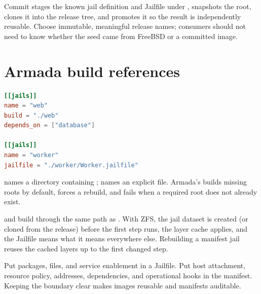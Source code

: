 Commit stages the known jail definition and Jailfile under
, snapshots the root, clones it into the release tree, and
promotes it so the result is independently reusable. Choose immutable,
meaningful release names; consumers should not need to know whether the seed
came from FreeBSD or a committed image.

\section{Armada build references}

\begin{lstlisting}[language=TOML]
[[jails]]
name = "web"
build = "./web"
depends_on = ["database"]

[[jails]]
name = "worker"
jailfile = "./worker/Worker.jailfile"
\end{lstlisting}

 names a directory containing ;
 names an explicit file. Armada's  builds missing
roots by default,  forces a rebuild, and
 fails when a required root does not already exist.

 and  build through the same path as
. With ZFS, the jail dataset is created (or cloned
from the release) before the first step runs, the layer cache applies, and the
Jailfile means what it means everywhere else. Rebuilding a manifest jail
reuses the cached layers up to the first changed step.

\begin{shipnote}
Put packages, files, and service enablement in a Jailfile. Put host attachment,
resource policy, addresses, dependencies, and operational hooks in the
manifest. Keeping the boundary clear makes images reusable and manifests
auditable.
\end{shipnote}
